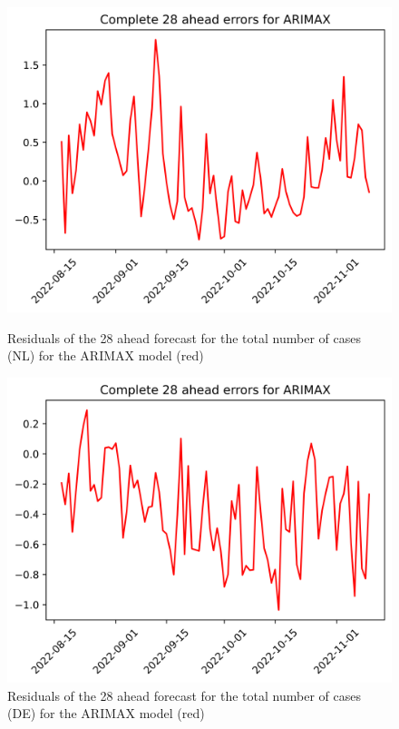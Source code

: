 \begin{figure}

\begin{minipage}{.45\textwidth}
  \centering
  \includegraphics[width=\linewidth]{pics/28_ah/28_ahead_errors_ARIMAX.png}
  \caption{Residuals of the 28 ahead forecast for the total number of cases (NL) for the ARIMAX model (red)}
  \label{fig:tot_cases_error_28_ARIMAX}
\end{minipage}
\begin{minipage}{.45\textwidth}
  \centering
  \includegraphics[width=\linewidth]{pics/28_ah/DE_28_ahead_errors_ARIMAX.png}
  \caption{Residuals of the 28 ahead forecast for the total number of cases (DE) for the ARIMAX model (red)}
  \label{fig:tot_cases_error_28_ARIMAX_DE}
\end{minipage}

\end{figure}
